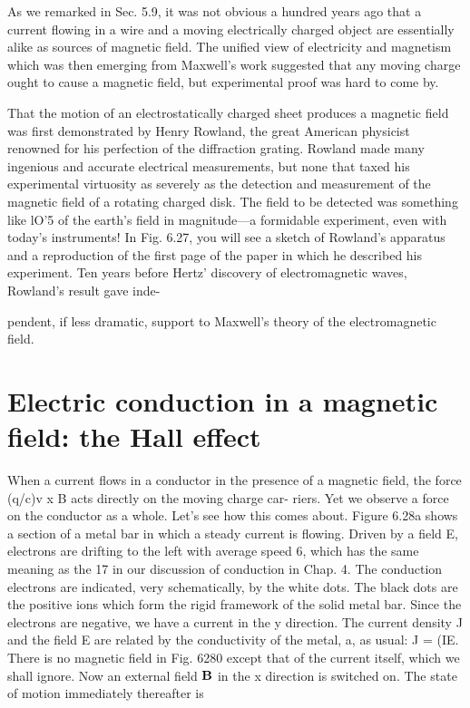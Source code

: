 As we remarked in Sec. 5.9, it was not obvious a hundred years
ago that a current flowing in a wire and a moving electrically charged
object are essentially alike as sources of magnetic field. The unified
view of electricity and magnetism which was then emerging from
Maxwell's work suggested that any moving charge ought to cause a
magnetic field, but experimental proof was hard to come by.

That the motion of an electrostatically charged sheet produces a
magnetic field was first demonstrated by Henry Rowland, the great
American physicist renowned for his perfection of the diffraction
grating. Rowland made many ingenious and accurate electrical
measurements, but none that taxed his experimental virtuosity as
severely as the detection and measurement of the magnetic field of
a rotating charged disk. The field to be detected was something like
lO'5 of the earth's field in magnitude---a formidable experiment,
even with today's instruments! In Fig. 6.27, you will see a sketch
of Rowland's apparatus and a reproduction of the first page of the
paper in which he described his experiment. Ten years before Hertz'
discovery of electromagnetic waves, Rowland's result gave inde-

pendent, if less dramatic, support to Maxwell's theory of the electromagnetic
field.

\section{Electric conduction in a magnetic field: the Hall effect}

When a current flows in a conductor in the presence of a magnetic
field, the force (q/c)v x B acts directly on the moving charge car-
riers. Yet we observe a force on the conductor as a whole. Let's
see how this comes about. Figure 6.28a shows a section of a metal
bar in which a steady current is flowing. Driven by a field E, electrons
are drifting to the left with average speed 6, which has the same
meaning as the 17 in our discussion of conduction in Chap. 4. The
conduction electrons are indicated, very schematically, by the white
dots. The black dots are the positive ions which form the rigid framework
of the solid metal bar. Since the electrons are negative, we have
a current in the y direction. The current density J and the field E
are related by the conductivity of the metal, a, as usual: J = (IE.
There is no magnetic field in Fig. 6280 except that of the current
itself, which we shall ignore. Now an external field $\mathbf{B}$ in the x direction
is switched on. The state of motion immediately thereafter is

